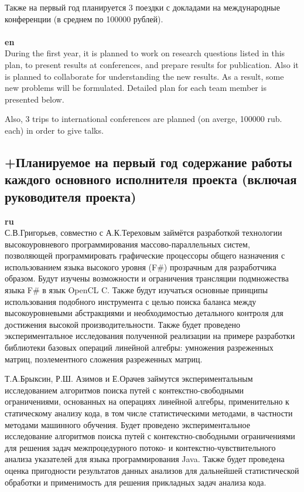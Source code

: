 \documentclass[12pt]{article}  %
\theoremstyle{remark}
\begin{document}
Также на первый год планируется 3 поездки с докладами на международные конференции (в среднем по 100000 рублей).
\\
\\
\textbf{en}\\
During the first year, it is planned to work on research questions listed in this plan, to present results at conferences, and prepare results for publication. Also it is planned to collaborate for understanding the new results. As a result, some new problems will be formulated. Detailed plan for each team member is presented below.

Also, 3 trips to international conferences are planned (on averge, 100000 rub. each) in order to give talks.



\subsection{+Планируемое на первый год содержание работы каждого основного исполнителя проекта (включая руководителя проекта)}

\textbf{ru}\\

С.В.Григорьев, совместно с А.К.Тереховым займётся разработкой технологии высокоуровневого программирования массово-параллельных систем, позволяющей программировать графические процессоры общего назначения с использованием языка высокого уровня (F\#) прозрачным для разработчика образом. Будут изучены возможности и ограничения трансляции подмножества языка F\# в язык OpenCL C. Также будут изучаться основные принципы использования подобного инструмента с целью поиска баланса между высокоуровневыми абстракциями и необходимостью детального контроля для достижения высокой производительности. Также будет проведено экспериментальное исследования полученной реализации на примере разработки библиотеки базовых операций линейной алгебры: умножения разреженных матриц, поэлементного сложения разреженных матриц.

Т.А.Брыксин, Р.Ш. Азимов и Е.Орачев займутся экспериментальным исследованием алгоритмов поиска путей с контекстно-свободными ограничениями, основанных на операциях линейной алгебры, применительно к статическому анализу кода, в том числе статистическими методами, в частности методами машинного обучения. Будет проведено экспериментальное исследование алгоритмов поиска путей с контекстно-свободными ограничениями для решения задач межпроцедурного потоко- и контекстно-чувствительного анализа указателей для языка программирования Java. Также будет проведена оценка пригодности результатов данных анализов для дальнейшей статистической обработки и применимость для решения прикладных задач анализа кода.
\end{document}
